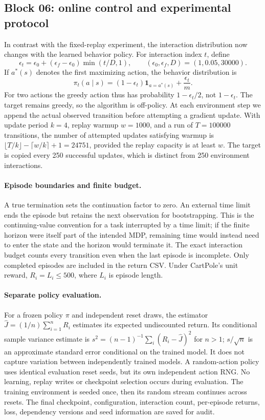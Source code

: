 \documentclass[11pt,a4paper]{article}
\newcommand{\one}{\mathbf 1}
\begin{document}
\subsection{Block 06: online control and experimental protocol}
In contrast with the fixed-replay experiment, the interaction distribution now
changes with the learned behavior policy. For interaction index $t$, define
\[
 \epsilon_t=\epsilon_0+(\epsilon_f-\epsilon_0)\min(t/D,1),
 \qquad (\epsilon_0,\epsilon_f,D)=(1,0.05,30000).
\]
If $a^*(s)$ denotes the first maximizing action, the behavior distribution is
\[
 \pi_t(a\mid s)=(1-\epsilon_t)\one_{a=a^*(s)}+\frac{\epsilon_t}{m}.
\]
For two actions the greedy action thus has probability $1-\epsilon_t/2$,
not $1-\epsilon_t$. The target remains greedy, so the algorithm is off-policy.
At each environment step we append the actual observed transition before
attempting a gradient update. With update period $k=4$, replay warmup $w=1000$,
and a run of $T=100000$ transitions, the number of attempted updates satisfying
warmup is $\lfloor T/k\rfloor-\lceil w/k\rceil+1=24751$, provided the replay
capacity is at least $w$. The target is copied every 250 successful updates,
which is distinct from 250 environment interactions.

\paragraph{Episode boundaries and finite budget.}
A true termination sets the continuation factor to zero. An external time
limit ends the episode but retains the next observation for bootstrapping.
This is the continuing-value convention for a task interrupted by a time
limit; if the finite horizon were itself part of the intended MDP, remaining
time would instead need to enter the state and the horizon would terminate it.
The exact interaction budget counts every transition even when the last episode
is incomplete. Only completed episodes are included in the return CSV. Under
CartPole's unit reward, $R_i=L_i\leq500$, where $L_i$ is episode length.

\paragraph{Separate policy evaluation.}
For a frozen policy $\pi$ and independent reset draws, the estimator
$\hat J=(1/n)\sum_{i=1}^n R_i$ estimates its expected undiscounted return.
Its conditional sample variance estimate is
$s^2=(n-1)^{-1}\sum_i(R_i-\hat J)^2$ for $n>1$; $s/\sqrt n$ is an
approximate standard error conditional on the trained model. It does not capture
variation between independently trained models. A random-action policy uses
identical evaluation reset seeds, but its own independent action RNG. No
learning, replay writes or checkpoint selection occurs during evaluation.
The training environment is seeded once, then its random stream continues
across resets. The final checkpoint, configuration, interaction count, per-episode
returns, loss, dependency versions and seed information are saved for audit.
\end{document}
